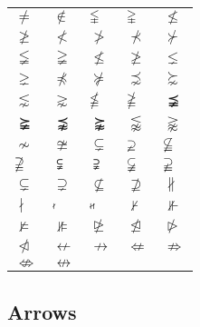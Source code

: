 \documentclass{article}
\begin{document}
\begin{tabular}{lllll}
$\neq $ & $\notin $ & $\lvertneqq $ & $\gvertneqq $ & $\nleq $ \\ 
$\ngeq $ & $\nless $ & $\ngtr $ & $\nprec $ & $\nsucc $ \\ 
$\lneqq $ & $\gneqq $ & $\nleqslant $ & $\ngeqslant $ & $\lneq $ \\ 
$\gneq $ & $\npreceq $ & $\nsucceq $ & $\precnsim $ & $\succnsim $ \\ 
$\lnsim $ & $\gnsim $ & $\nleqq $ & $\ngeqq $ & $\precneqq $ \\ 
$\succneqq $ & $\precnapprox $ & $\succnapprox $ & $\lnapprox $ & $\gnapprox 
$ \\ 
$\nsim $ & $\ncong $ & $\varsubsetneq $ & $\varsupsetneq $ & $\nsubseteqq $
\\ 
$\nsupseteqq $ & $\subsetneqq $ & $\supsetneqq $ & $\varsubsetneqq $ & $%
\varsupsetneqq $ \\ 
$\subsetneq $ & $\supsetneq $ & $\nsubseteq $ & $\nsupseteq $ & $\nparallel $
\\ 
$\nmid $ & $\nshortmid $ & $\nshortparallel $ & $\nvdash $ & $\nVdash $ \\ 
$\nvDash $ & $\nVDash $ & $\ntrianglerighteq $ & $\ntrianglelefteq $ & $%
\ntriangleright $ \\ 
$\ntriangleleft $ & $\nleftarrow $ & $\nrightarrow $ & $\nLeftarrow $ & $%
\nRightarrow $ \\ 
$\nLeftrightarrow $ & $\nleftrightarrow $ &  &  & 
\end{tabular}

\subsection{Arrows}
\end{document}
